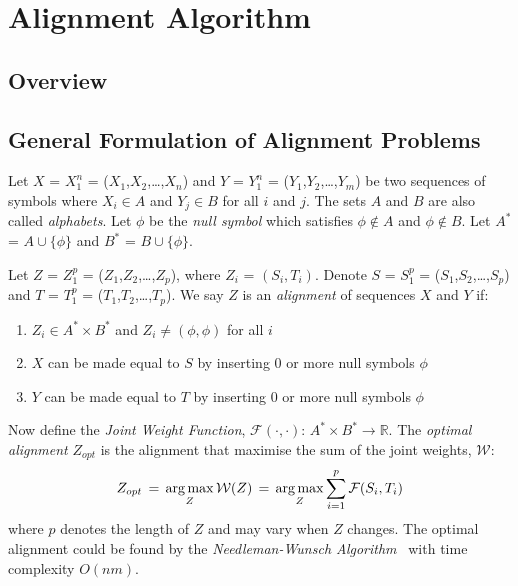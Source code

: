 
\chapter{Alignment Algorithm}

\ifpdf
    \graphicspath{{Chapter5/Figs/Raster/}{Chapter5/Figs/PDF/}{Chapter5/Figs/}}
\else
    \graphicspath{{Chapter5/Figs/Vector/}{Chapter5/Figs/}}
\fi


\section{Overview}

\section{General Formulation of Alignment Problems}
\label{sec:diff-formulation}

Let $X$ = $X_1^n$ = ($X_1$,$X_2$,\ldots,$X_n$) and $Y$ = $Y_1^n$ = ($Y_1$,$Y_2$,\ldots,$Y_m$) be two sequences of symbols where $X_i \in A$ and $Y_j \in B$ for all $i$ and $j$. The sets $A$ and $B$ are also called \textit{alphabets}. Let $\phi$ be the \textit{null symbol} which satisfies $\phi \notin A$ and $\phi \notin B$. Let $A^*$ = $A\cup\{\phi\}$ and $B^*$ = $B\cup\{\phi\}$.

Let $Z$ = $Z_1^p$ = ($Z_1$,$Z_2$,\ldots,$Z_p$), where $Z_i$ = $(S_i, T_i)$. Denote $S$ = $S_1^p$ = ($S_1$,$S_2$,\ldots,$S_p$) and $T$ = $T_1^p$ = ($T_1$,$T_2$,\ldots,$T_p$). We say $Z$ is an \textit{alignment} of sequences $X$ and $Y$ if:
\begin{enumerate}
  \item $Z_i \in A^* \times B^*$ and $Z_i \neq (\phi,\phi)$ for all $i$
  \item $X$ can be made equal to $S$ by inserting 0 or more null symbols $\phi$
  \item $Y$ can be made equal to $T$ by inserting 0 or more null symbols $\phi$
\end{enumerate}

Now define the \textit{Joint Weight Function}, $\mathcal{F}(\cdot,\cdot)$: $A^* \times B^* \to \mathbb{R}$. The \textit{optimal alignment} $Z_{opt}$ is the alignment that maximise the sum of the joint weights, $\mathcal{W}$:
\begin{equation}
  Z_{opt} \,=\, \operatorname*{arg\,max}_{Z} \mathcal{W}(Z) \,=\, \operatorname*{arg\,max}_{Z} \sum_{i=1}^{p} \mathcal{F}(S_i,T_i)
\end{equation}
where $p$ denotes the length of $Z$ and may vary when $Z$ changes. The optimal alignment could be found by the \textit{Needleman-Wunsch Algorithm}~\cite{needleman1970general} with time complexity $O(nm)$.

